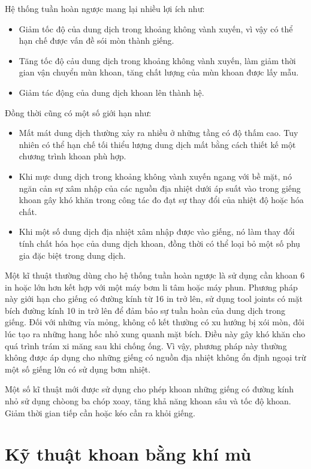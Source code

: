 \documentclass[13pt,a4paper]{article}
\begin{document}
	Hệ thống tuần hoàn ngược mang lại nhiều lợi ích như:
	\begin{itemize}
		\item Giảm tốc độ của dung dịch trong khoảng không vành xuyến, vì vậy có thể hạn chế được vấn đề sói mòn thành giếng.
		\item Tăng tốc độ cảu dung dịch trong khoảng không vành xuyến, làm giảm thời gian vận chuyển mùn khoan, tăng chất lượng của mùn khoan được lấy mẫu.
		\item Giảm tác động của dung dịch khoan lên thành hệ.
	\end{itemize}
	Đồng thời cũng có một số giới hạn như:
	\begin{itemize}
		\item Mất mát dung dịch thường xảy ra nhiều ở những tầng có độ thấm cao. Tuy nhiên có thể hạn chế tối thiểu lượng dung dịch mất bằng cách thiết kế một chương trình khoan phù hợp.
		\item Khi mực dung dịch trong khoảng không vành xuyến ngang với bề mặt, nó ngăn cản sự xâm nhập của các nguồn địa nhiệt dưới áp suất vào trong giếng khoan gây khó khăn trong công tác đo đạt sự thay đổi của nhiệt độ hoặc hóa chất.
		\item Khi một số dung dịch địa nhiệt xâm nhập được vào giếng, nó làm thay đổi tính chất hóa học của dung dịch khoan, đồng thời có thể loại bỏ một số phụ gia đặc biệt trong dung dịch.
	\end{itemize}
	\par
	Một kĩ thuật thường dùng cho hệ thống tuần hoàn ngược là sử dụng cần khoan 6 in hoặc lớn hơn kết hợp với một máy bơm li tâm hoặc máy phun. Phương pháp này giới hạn cho giếng có đường kính từ 16 in trở lên, sử dụng tool joints có mặt bích đường kính 10 in trở lên để đảm bảo sự tuần hoàn của dung dịch trong giếng. Đối với những vỉa mỏng, không cố kết thường có xu hướng bị xói mòn, đôi lúc tạo ra những hang hốc nhỏ xung quanh mặt bích. Điều này gây khó khăn cho quá trình trám xi măng sau khi chống ống. Vì vậy, phương pháp này thường không được áp dụng cho những giếng có nguồn địa nhiệt không ổn định ngoại trừ một số giếng lớn có sử dụng bơm nhiệt.\par
	Một số kĩ thuật mới được sử dụng cho phép khoan những giếng có đường kính nhỏ sử dụng chòong ba chóp xoay, tăng khả năng khoan sâu và tốc độ khoan. Giảm thời gian tiếp cần hoặc kéo cần ra khỏi giếng.\par
\section{Kỹ thuật khoan bằng khí mù}
\end{document}
